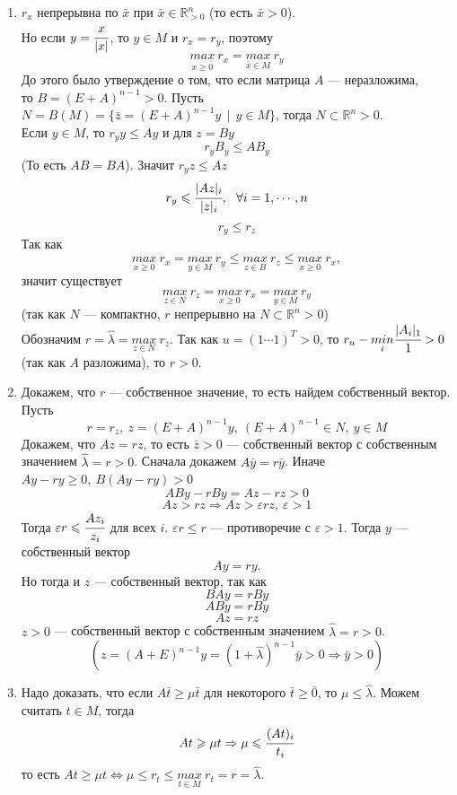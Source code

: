\documentclass[12pt]{article}
\theoremstyle{definition}
\numberwithin{equation}{section}
\begin{document}
\begin{enumerate}
    \item $r_x$ непрерывна по $\bar x$ при $\bar x \in \mathbb{R}^n_{>0}$ (то есть $\bar x >0$).\\
    Но если $y=\cfrac{x}{|x|}$, то $y \in M$ и $r_x=r_y$, поэтому $$\underset{x \geqslant \bar 0}{max}~r_x=\underset{\bar x \in M}{max}~r_y$$
    До этого было утверждение о том, что если матрица $A$ --- неразложима, \\то $B=(E+A)^{n-1}>0$. Пусть $N=B(M)= \{\bar z =(E+A)^{n-1} y~~|~~y \in M \}$, тогда $N \subset \mathbb{R}^n>0$.\\
    Если $y\in M$, то $r_y y \leqslant Ay$ и для $z=By$ $$r_yB_y \leqslant AB_y$$ (То есть $AB=BA$). Значит $r_y z \leqslant Az$ $$r_y \leqslant \cfrac{|Az|_i}{|z|_i},~~\forall i=1,\cdots, n$$ $$r_y \leqslant r_z$$
    Так как $$\underset{x \geqslant 0}{max}~r_x=\underset{y \in M}{max}~r_y \leqslant \underset{z\in B}{max}~r_z \leqslant \underset{x\geqslant 0}{max} ~r_x,$$ значит существует $$\underset{z\in N}{max}~r_z=\underset{x \geqslant 0}{max} ~r_x = \underset{y\in M}{max} ~r_y$$
    (так как $N$ --- компактно, $r$ непрерывно на $N \subset \mathbb{R}^n>0$)\\
    Обозначим $r=\hat \lambda =\underset{z\in N}{max}~r_z$. Так как $u=(1 \cdots 1)^T>0$, то $r_u-\underset{i}{min}\cfrac{|A_i|_1}{1}>0$ (так как $A$ разложима), то $r>0$.
    \item Докажем, что $r$ --- собственное значение, то есть найдем собственный вектор. Пусть $$r=r_z,~z=(E+A)^{n-1}y,~(E+A)^{n-1} \in N,~y\in M$$
    Докажем, что $Az=rz$, то есть $\bar z>0$ --- собственный вектор с собственным значением $\hat \lambda=r>0$. Сначала докажем $A\bar y=r \bar y$. Иначе $Ay-ry \geqslant 0,~B(Ay-ry)>0$ $$ABy-rBy=Az-rz>0$$ $$Az>rz \Rightarrow Az> \varepsilon rz, ~\varepsilon >1$$
    Тогда $\varepsilon r \leqslant \cfrac{Az_i}{z_i}$ для всех $i$. $\varepsilon r \leqslant r$ --- противоречие с $\varepsilon >1$. Тогда $y$ --- собственный вектор $$Ay=ry.$$ Но тогда и $z$ --- собственный вектор, так как $$BAy=rBy$$ $$ABy=rBy$$ $$Az=rz$$
    $z>0$ --- собственный вектор с собственным значением $\hat \lambda =r>0$.
    $$(z=(A+E)^{n-1}y=(1+\hat \lambda)^{n-1} \bar y>0 \Rightarrow \bar y>0)$$
    \item Надо доказать, что если $A\bar t \geqslant \mu \bar t$ для некоторого $\bar t \geqslant \bar 0$, то $\mu \leqslant \hat \lambda$. Можем считать $t \in M$, тогда $$At \geqslant \mu t \Rightarrow \mu \leqslant \cfrac{(At)_i}{t_i}$$ то есть $At \geqslant \mu t \Leftrightarrow \mu \leqslant r_t \leqslant \underset{t\in M}{max}~r_t=r=\hat \lambda$.

\end{enumerate}
\end{document}
